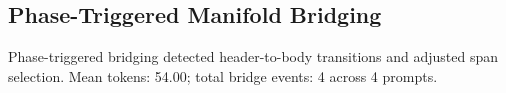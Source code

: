 \subsection{Phase-Triggered Manifold Bridging}
Phase-triggered bridging detected header-to-body transitions and adjusted span selection.
Mean tokens: 54.00; total bridge events: 4 across 4 prompts.
